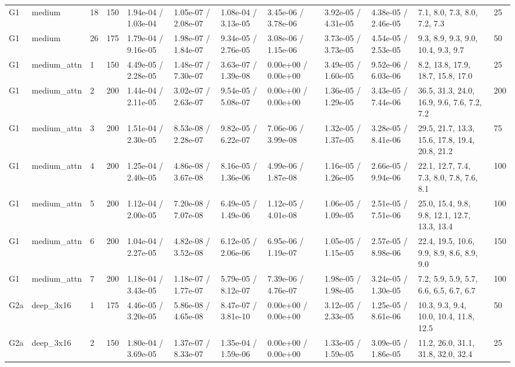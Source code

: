 \documentclass[10pt,a4paper]{article}
\begin{document}
\begin{landscape}
\begin{tiny}
\begin{longtable}{llllllllllll}
G1 & medium & 18 & 150 & 1.94e-04 / 1.03e-04 & 1.05e-07 / 2.08e-07 & 1.08e-04 / 3.13e-05 & 3.45e-06 / 3.78e-06 & 3.92e-05 / 4.31e-05 & 4.38e-05 / 2.46e-05 & 7.1, 8.0, 7.3, 8.0, 7.2, 7.3 & 25 \\
G1 & medium & 26 & 175 & 1.79e-04 / 9.16e-05 & 1.98e-07 / 1.84e-07 & 9.34e-05 / 2.76e-05 & 3.08e-06 / 1.15e-06 & 3.73e-05 / 3.73e-05 & 4.54e-05 / 2.53e-05 & 9.3, 8.9, 9.3, 9.0, 10.4, 9.3, 9.7 & 50 \\
G1 & medium\_attn & 1 & 150 & 4.49e-05 / 2.28e-05 & 1.48e-07 / 7.30e-07 & 3.63e-07 / 1.39e-08 & 0.00e+00 / 0.00e+00 & 3.49e-05 / 1.60e-05 & 9.52e-06 / 6.03e-06 & 8.2, 13.8, 17.9, 18.7, 15.8, 17.0 & 25 \\
G1 & medium\_attn & 2 & 200 & 1.44e-04 / 2.11e-05 & 3.02e-07 / 2.63e-07 & 9.54e-05 / 5.08e-07 & 0.00e+00 / 0.00e+00 & 1.36e-05 / 1.29e-05 & 3.43e-05 / 7.44e-06 & 36.5, 31.3, 24.0, 16.9, 9.6, 7.6, 7.2, 7.2 & 200 \\
G1 & medium\_attn & 3 & 200 & 1.51e-04 / 2.30e-05 & 8.53e-08 / 2.28e-07 & 9.82e-05 / 6.22e-07 & 7.06e-06 / 3.99e-08 & 1.32e-05 / 1.37e-05 & 3.28e-05 / 8.41e-06 & 29.5, 21.7, 13.3, 15.6, 17.8, 19.4, 20.8, 21.2 & 75 \\
G1 & medium\_attn & 4 & 200 & 1.25e-04 / 2.40e-05 & 4.86e-08 / 3.67e-08 & 8.16e-05 / 1.36e-06 & 4.99e-06 / 1.87e-08 & 1.16e-05 / 1.26e-05 & 2.66e-05 / 9.94e-06 & 22.1, 12.7, 7.4, 7.3, 8.0, 7.8, 7.6, 8.1 & 100 \\
G1 & medium\_attn & 5 & 200 & 1.12e-04 / 2.00e-05 & 7.20e-08 / 7.07e-08 & 6.49e-05 / 1.49e-06 & 1.12e-05 / 4.01e-08 & 1.06e-05 / 1.09e-05 & 2.51e-05 / 7.51e-06 & 25.0, 15.4, 9.8, 9.8, 12.1, 12.7, 13.3, 13.4 & 100 \\
G1 & medium\_attn & 6 & 200 & 1.04e-04 / 2.27e-05 & 4.82e-08 / 3.52e-08 & 6.12e-05 / 2.06e-06 & 6.95e-06 / 1.19e-07 & 1.05e-05 / 1.15e-05 & 2.57e-05 / 8.98e-06 & 22.4, 19.5, 10.6, 9.9, 8.9, 8.6, 8.9, 9.0 & 150 \\
G1 & medium\_attn & 7 & 200 & 1.18e-04 / 3.43e-05 & 1.18e-07 / 1.77e-07 & 5.79e-05 / 8.12e-07 & 7.39e-06 / 4.76e-07 & 1.98e-05 / 1.98e-05 & 3.24e-05 / 1.30e-05 & 7.2, 5.9, 5.9, 5.7, 6.6, 6.5, 6.7, 6.7 & 100 \\
G2a & deep\_3x16 & 1 & 175 & 4.46e-05 / 3.20e-05 & 5.86e-08 / 4.65e-08 & 8.47e-07 / 3.81e-10 & 0.00e+00 / 0.00e+00 & 3.12e-05 / 2.33e-05 & 1.25e-05 / 8.61e-06 & 10.3, 9.3, 9.4, 10.0, 10.4, 11.8, 12.5 & 50 \\
G2a & deep\_3x16 & 2 & 150 & 1.80e-04 / 3.69e-05 & 1.37e-07 / 8.33e-07 & 1.35e-04 / 1.59e-06 & 0.00e+00 / 0.00e+00 & 1.33e-05 / 1.59e-05 & 3.09e-05 / 1.86e-05 & 11.2, 26.0, 31.1, 31.8, 32.0, 32.4 & 25 \\

\end{longtable}
\end{tiny}
\end{landscape}
\end{document}
